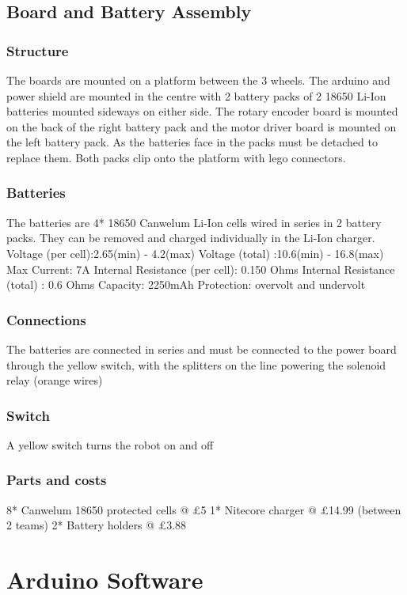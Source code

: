 \subsection{Board and Battery Assembly}
\subsubsection{Structure}
The boards are mounted on a platform between the 3 wheels. The arduino and power
shield are mounted in the centre with 2 battery packs of 2 18650 Li-Ion batteries mounted sideways on either
side. The rotary encoder board is
mounted on the back of the right battery pack and the motor driver board is mounted
on the left battery pack. As the batteries face in the packs must be detached to
replace them. Both packs clip onto the platform with lego connectors.

\subsubsection{Batteries}
The batteries are 4* 18650 Canwelum Li-Ion cells wired in series in 2 battery packs. They can be removed and charged individually in the Li-Ion charger.
	Voltage (per cell):2.65(min) - 4.2(max)
    Voltage (total)   :10.6(min) - 16.8(max)
    Max Current: 7A
    Internal Resistance (per cell): 0.150 Ohms
    Internal Resistance (total)   : 0.6   Ohms
    Capacity: 2250mAh
	Protection: overvolt and undervolt
    
\subsubsection{Connections}
The batteries are connected in series and must be connected to the power board through the yellow switch, with the splitters on the line powering the solenoid relay (orange wires)
\subsubsection{Switch}
A yellow switch turns the robot on and off

\subsubsection{Parts and costs}
8* Canwelum 18650 protected cells @ £5
1* Nitecore charger               @ £14.99 (between 2 teams)
2* Battery holders                @ £3.88

\section{Arduino Software}
